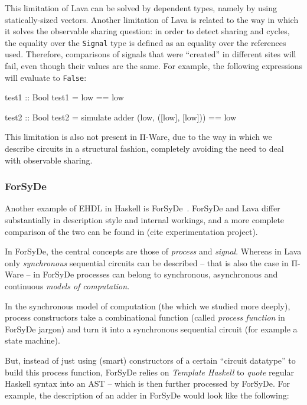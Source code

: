             This limitation of Lava can be solved by dependent types, namely by using statically-sized vectors.
            Another limitation of Lava is related to the way in which it solves the observable sharing question:
            in order to detect sharing and cycles, the equality over the \texttt{Signal} type is defined
            as an equality over the references used.
            Therefore, comparisons of signals that were ``created'' in different sites will fail,
            even though their values are the same.
            For example, the following expressions will evaluate to \texttt{False}:

            \begin{haskellcode}
        test1 :: Bool
        test1 = low == low

        test2 :: Bool
        test2 = simulate adder (low, ([low], [low])) == low
            \end{haskellcode}

            This limitation is also not present in Π-Ware, due to the way in which we describe circuits
            in a structural fashion, completely avoiding the need to deal with observable sharing.


            \subsubsection{ForSyDe}
            Another example of \ac{EHDL} in Haskell is ForSyDe~\cite{forsyde1999}.
            ForSyDe and Lava differ substantially in description style and internal workings,
            and a more complete comparison of the two can be found in (cite experimentation project).

            In ForSyDe, the central concepts are those of \emph{process} and \emph{signal}.
            Whereas in Lava only \emph{synchronous} sequential circuits can be described -- that is
            also the case in Π-Ware -- in ForSyDe processes can belong to synchronous,
            asynchronous and continuous \emph{models of computation}.

            In the synchronous model of computation (the which we studied more deeply),
            process constructors take a combinational function (called \emph{process function} in
            ForSyDe jargon) and turn it into a synchronous sequential circuit
            (for example a state machine).

            But, instead of just using (smart) constructors of a certain ``circuit datatype'' to build
            this process function, ForSyDe relies on \emph{Template Haskell} to
            \emph{quote} regular Haskell syntax into an \ac{AST} -- which is then further processed by ForSyDe.
            For example, the description of an adder in ForSyDe would look like the following:
            
